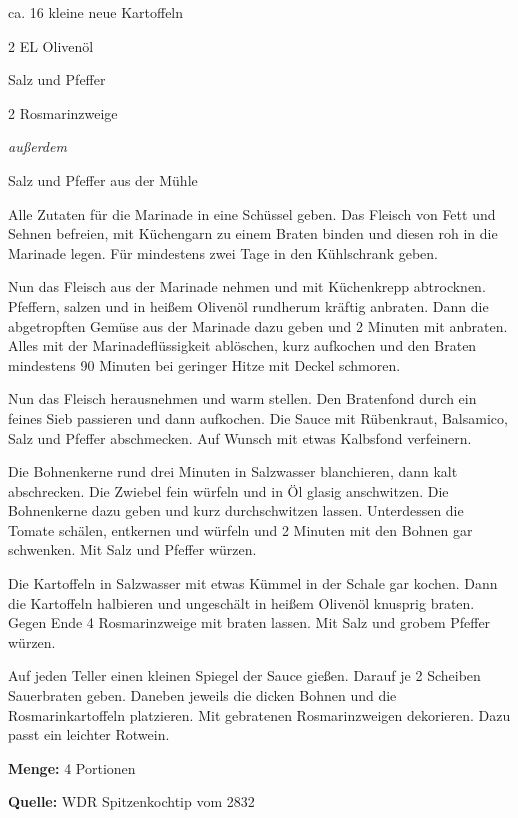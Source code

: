 {\begin{multicols}{2}
ca. 16 kleine neue Kartoffeln

2 EL Olivenöl

Salz und Pfeffer

2 Rosmarinzweige

\textit{außerdem}



Salz und Pfeffer aus der Mühle


\end{multicols}

Alle Zutaten für die Marinade in eine Schüssel geben. Das Fleisch von Fett und Sehnen befreien, mit Küchengarn zu einem Braten binden und diesen roh in die Marinade legen. Für mindestens zwei Tage in den Kühlschrank geben.

Nun das Fleisch aus der Marinade nehmen und mit Küchenkrepp abtrocknen. Pfeffern, salzen und in heißem Olivenöl rundherum kräftig anbraten. Dann die abgetropften Gemüse aus der Marinade dazu geben und 2 Minuten mit anbraten. Alles mit der Marinadeflüssigkeit ablöschen, kurz aufkochen und den Braten mindestens 90 Minuten bei geringer Hitze mit Deckel schmoren.

Nun das Fleisch herausnehmen und warm stellen. Den Bratenfond durch ein feines Sieb passieren und dann aufkochen. Die Sauce mit Rübenkraut, Balsamico, Salz und Pfeffer abschmecken. Auf Wunsch mit etwas Kalbsfond verfeinern.

Die Bohnenkerne rund drei Minuten in Salzwasser blanchieren, dann kalt abschrecken. Die Zwiebel fein würfeln und in Öl glasig anschwitzen. Die Bohnenkerne dazu geben und kurz durchschwitzen lassen. Unterdessen die Tomate schälen, entkernen und würfeln und 2 Minuten mit den Bohnen gar schwenken. Mit Salz und Pfeffer würzen.

Die Kartoffeln in Salzwasser mit etwas Kümmel in der Schale gar kochen. Dann die Kartoffeln halbieren und ungeschält in heißem Olivenöl knusprig braten. Gegen Ende 4 Rosmarinzweige mit braten lassen. Mit Salz und grobem Pfeffer würzen.

Auf jeden Teller einen kleinen Spiegel der Sauce gießen. Darauf je 2 Scheiben Sauerbraten geben. Daneben jeweils die dicken Bohnen und die Rosmarinkartoffeln platzieren. Mit gebratenen Rosmarinzweigen dekorieren. Dazu passt ein leichter Rotwein.


{\bfseries Menge:} 4 Portionen

{\bfseries Quelle:} WDR Spitzenkochtip vom 2832 

} 

